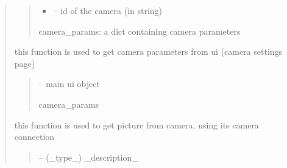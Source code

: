 \documentclass[letterpaper,10pt,english]{sphinxmanual}
\begin{document}
\begin{quote}
\begin{savenotes}
\begin{fulllineitems}
\begin{quote}
\begin{description}
\begin{itemize}
\item {} 
\sphinxAtStartPar
{} – id of the camera (in string)

\end{itemize}

\sphinxAtStartPar
camera\_params: a dict containing camera parameters

\end{description}\end{quote}

\end{fulllineitems}\end{savenotes}


\begin{savenotes}\begin{fulllineitems}
\label{\detokenize{setting/backend/camera_funcs:oxin.backend.camera_funcs.get_camera_params_from_ui}}
\pysigstartsignatures
{}
\pysigstopsignatures
\sphinxAtStartPar
this function is used to get camera parameters from ui (camera settings page)
\begin{quote}\begin{description}
\sphinxAtStartPar
{} – main ui object

\sphinxAtStartPar
camera\_params

\end{description}\end{quote}

\end{fulllineitems}\end{savenotes}


\begin{savenotes}\begin{fulllineitems}
\label{\detokenize{setting/backend/camera_funcs:oxin.backend.camera_funcs.get_picture_from_camera}}
\pysigstartsignatures
{}
\pysigstopsignatures
\sphinxAtStartPar
this function is used to get picture from camera, using its camera connection
\begin{quote}\begin{description}
\sphinxAtStartPar
{} – (\_type\_) \_description\_


\end{description}
\end{quote}
\end{fulllineitems}
\end{savenotes}
\end{quote}
\end{document}
